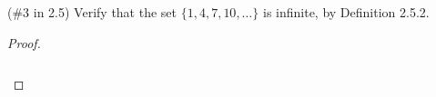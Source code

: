 (\#3 in 2.5) Verify that the set $\{1,4,7,10,\ldots\}$ is infinite, by
Definition 2.5.2.

    \begin{proof}\renewcommand{\qedsymbol}{}\ \\\\
        \begin{align*}
        \end{align*}
    \end{proof}